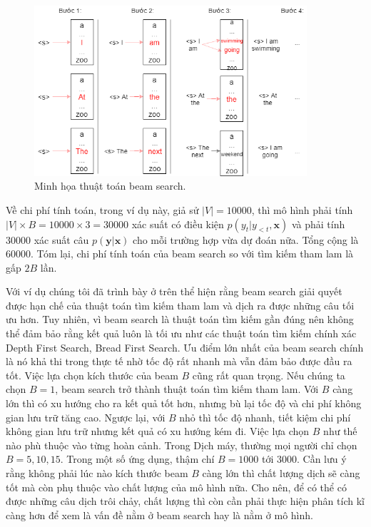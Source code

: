\begin{figure}
	\centering
	\includegraphics[width=0.9\textwidth]{beam-search.png}
	\caption[Minh họa thuật toán beam search.]{Minh họa thuật toán beam search.}
	\label{fig_beam-search}
\end{figure}
Về chi phí tính toán, trong ví dụ này, giả sử $|V| = 10000$, thì mô hình phải tính  $|V| \times B = 10000 \times 3 = 30000$ xác suất có điều kiện $p(y_t | y_{<t}, \bm{x})$  và phải tính $30000$ xác suất câu $p(\bm{y} | \bm{x})$ cho mỗi trường hợp vừa dự đoán nữa. Tổng cộng là $60000$. Tóm lại, chi phí tính toán của beam search so với tìm kiếm tham lam là gấp $2B$ lần.

Với ví dụ chúng tôi đã trình bày ở trên thể hiện rằng beam search giải quyết được hạn chế của thuật toán tìm kiếm tham lam và dịch ra được những câu tối ưu hơn. Tuy nhiên, vì beam search là thuật toán tìm kiếm gần đúng nên không thể đảm bảo rằng kết quả luôn là tối ưu như các thuật toán tìm kiếm chính xác Depth First Search, Bread First Search. Ưu điểm lớn nhất của beam search chính là nó khả thi trong thực tế nhờ tốc độ rất nhanh mà vẫn đảm bảo được đầu ra tốt. Việc lựa chọn kích thước của beam $B$ cũng rất quan trọng. Nếu chúng ta chọn $B = 1$, beam search trở thành thuật toán tìm kiếm tham lam. Với $B$ càng lớn thì có xu hướng cho ra kết quả tốt hơn, nhưng bù lại tốc độ và chi phí không gian lưu trữ tăng cao. Ngược lại, với $B$ nhỏ thì tốc độ nhanh, tiết kiệm chi phí không gian lưu trữ nhưng kết quả có xu hướng kém đi. Việc lựa chọn $B$ như thế nào phù thuộc vào từng hoàn cảnh. Trong Dịch máy, thường mọi người chỉ chọn $B = 5, 10, 15$. Trong một số ứng dụng, thậm chí $B = 1000$ tới $3000$. Cần lưu ý rằng không phải lúc nào kích thước beam $B$ càng lớn thì chất lượng dịch sẽ càng tốt mà còn phụ thuộc vào chất lượng của mô hình nữa. Cho nên, để có thể có được những câu dịch trôi chảy, chất lượng thì còn cần phải thực hiện phân tích kĩ càng hơn để xem là vấn đề nằm ở beam search hay là nằm ở mô hình.


